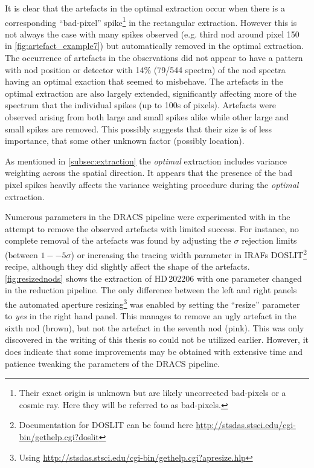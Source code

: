 It is clear that the artefacts in the optimal extraction occur when there is a corresponding ``bad-pixel'' spike\footnote{Their exact origin is unknown but are likely uncorrected bad-pixels or a cosmic ray.
Here they will be referred to as bad-pixels.} in the rectangular extraction.
However this is not always the case with many spikes observed (e.g. third nod around pixel 150 in \cref{fig:artefact_example7}) but automatically removed in the optimal extraction.
The occurrence of artefacts in the observations did not appear to have a pattern with nod position or detector with 14\% (79/544 spectra) of the nod spectra having an optimal exaction that seemed to misbehave.
The artefacts in the optimal extraction are also largely extended, significantly affecting more of the spectrum that the individual spikes (up to 100s of pixels).
Artefacts were observed arising from both large and small spikes alike while other large and small spikes are removed.
This possibly suggests that their size is of less importance, that some other unknown factor (possibly location).

As mentioned in \cref{subsec:extraction} the \emph{optimal} extraction includes variance weighting across the spatial direction.
It appears that the presence of the bad pixel spikes heavily affects the variance weighting procedure during the \emph{optimal} extraction.

Numerous parameters in the {DRACS} pipeline were experimented with in the attempt to remove the observed artefacts with limited success.
For instance, no complete removal of the artefacts was found by adjusting the \(\sigma\) rejection limits (between \(1--5 \sigma\)) or  increasing the tracing width parameter in {IRAF}s DOSLIT\footnote{Documentation for DOSLIT can be found here \href{http://stsdas.stsci.edu/cgi-bin/gethelp.cgi?doslit}{http://stsdas.stsci.edu/cgi-bin/gethelp.cgi?doslit}} recipe, although they did slightly affect the shape of the artefacts.
\cref{fig:resizednods} shows the extraction of HD\,202206 with one parameter changed in the reduction pipeline.
The only difference between the left and right panels the automated aperture resizing\footnote{Using \href{apresize}{http://stsdas.stsci.edu/cgi-bin/gethelp.cgi?apresize.hlp}} was enabled by setting the ``resize'' parameter to \emph{yes} in the right hand panel.
This manages to remove an ugly artefact in the sixth nod (brown), but not the artefact in the seventh nod (pink).
This was only discovered in the writing of this thesis so could not be utilized earlier.
However, it does indicate that some improvements may be obtained with extensive time and patience tweaking the parameters of the {DRACS} pipeline.

